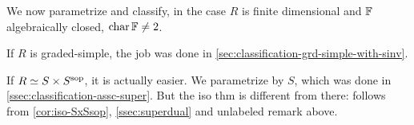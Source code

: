 We now parametrize and classify, in the case $R$ is finite dimensional and $\mathbb{F}$ algebraically closed, $\operatorname{char} \mathbb{F} \neq 2$. 

If $R$ is graded-simple, the job was done in \cref{sec:classification-grd-simple-with-sinv}.

If $R \simeq S\times S^{\mathrm{sop}}$, it is actually easier. 
We parametrize by $S$, which was done in \cref{ssec:classification-assc-super}. 
But the iso thm is different from there: follows from \cref{cor:iso-SxSsop},  \cref{ssec:superdual} and unlabeled remark above. 









